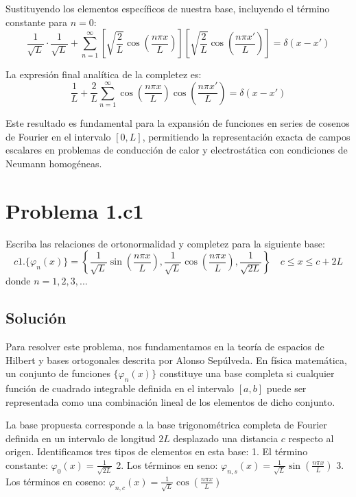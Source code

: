 \documentclass[a4paper]{article}
\begin{document}
Sustituyendo los elementos específicos de nuestra base, incluyendo el término constante para $n=0$:
$$ \frac{1}{\sqrt{L}} \cdot \frac{1}{\sqrt{L}} + \sum_{n=1}^{\infty} \left[ \sqrt{\frac{2}{L}} \cos\left(\frac{n\pi x}{L}\right) \right] \left[ \sqrt{\frac{2}{L}} \cos\left(\frac{n\pi x'}{L}\right) \right] = \delta(x - x') $$

La expresión final analítica de la completez es:
$$ \frac{1}{L} + \frac{2}{L} \sum_{n=1}^{\infty} \cos\left(\frac{n\pi x}{L}\right) \cos\left(\frac{n\pi x'}{L}\right) = \delta(x - x') $$

Este resultado es fundamental para la expansión de funciones en series de cosenos de Fourier en el intervalo $[0, L]$, permitiendo la representación exacta de campos escalares en problemas de conducción de calor y electrostática con condiciones de Neumann homogéneas.


\section{Problema 1.c1}
Escriba las relaciones de ortonormalidad y completez para la siguiente base:
$$ c1. \{\varphi_n(x)\} = \left\{\frac{1}{\sqrt{L}} \sin\left(\frac{n\pi x}{L}\right), \frac{1}{\sqrt{L}} \cos\left(\frac{n\pi x}{L}\right), \frac{1}{\sqrt{2L}}\right\} \quad c \leq x \leq c+ 2L $$
donde $n = 1, 2, 3, ...$

\subsection{Solución}

Para resolver este problema, nos fundamentamos en la teoría de espacios de Hilbert y bases ortogonales descrita por Alonso Sepúlveda. En física matemática, un conjunto de funciones $\{\varphi_n(x)\}$ constituye una base completa si cualquier función de cuadrado integrable definida en el intervalo $[a, b]$ puede ser representada como una combinación lineal de los elementos de dicho conjunto. 

La base propuesta corresponde a la base trigonométrica completa de Fourier definida en un intervalo de longitud $2L$ desplazado una distancia $c$ respecto al origen. Identificamos tres tipos de elementos en esta base:
1. El término constante: $\varphi_0(x) = \frac{1}{\sqrt{2L}}$
2. Los términos en seno: $\varphi_{n,s}(x) = \frac{1}{\sqrt{L}} \sin\left(\frac{n\pi x}{L}\right)$
3. Los términos en coseno: $\varphi_{n,c}(x) = \frac{1}{\sqrt{L}} \cos\left(\frac{n\pi x}{L}\right)$
\end{document}
